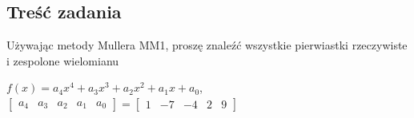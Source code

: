 \documentclass[11pt, oneside]{article}   	%
\begin{document}
\subsection{Treść zadania}
Używając metody Mullera MM1, proszę znaleźć wszystkie pierwiastki rzeczywiste i zespolone wielomianu
\begin{center}
$f(x) = a_{4}x^4+a_{3}x^3+a_{2}x^2+a_{1}x+a_{0}$,  
$
\left[
\begin{array}{ccccc}
       a_{4} & a_{3} & a_{2} & a_{1} & a_{0}
\end{array}
\right]
=
\left[
\begin{array}{ccccc}
       1 & -7 & -4 & 2 & 9
\end{array}
\right]$
\end{center}
\end{document}
